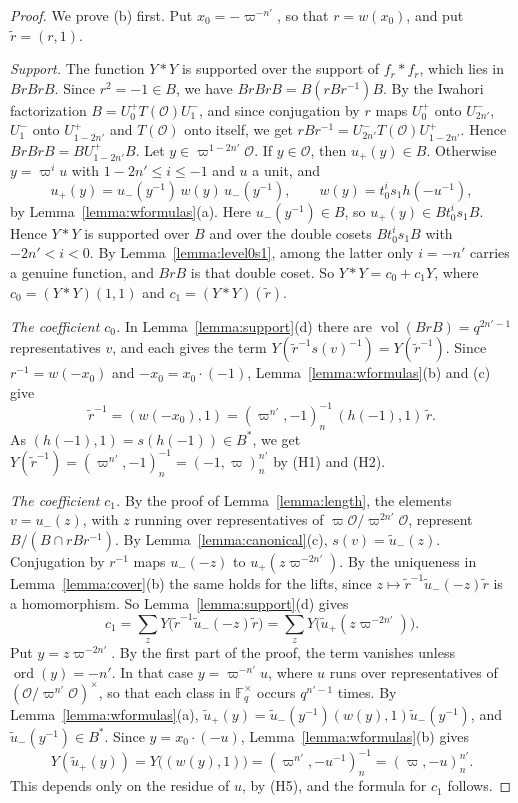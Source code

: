 \documentclass[12pt,letterpaper]{amsart}
\numberwithin{equation}{section}
\theoremstyle{definition}
\theoremstyle{remark}
\DeclareMathOperator{\vol}{vol}
\DeclareMathOperator{\ord}{ord}
\newcommand{\cO}{\mathcal{O}}
\newcommand{\Fq}{\mathbb{F}_q}
\begin{document}
\begin{proof}
We prove (b) first. Put $x_0=-\varpi^{-n'}$, so that $r=w(x_0)$, and
put $\tilde r=(r,1)$.

\emph{Support.} The function $Y*Y$ is supported over the support of
$f_r*f_r$, which lies in $BrBrB$. Since $r^2=-1\in B$, we have
$BrBrB=B(rBr^{-1})B$. By the Iwahori factorization
$B=U^+_0T(\cO)U^-_1$, and since conjugation by $r$ maps $U^+_0$ onto
$U^-_{2n'}$, $U^-_1$ onto $U^+_{1-2n'}$ and $T(\cO)$ onto itself, we
get $rBr^{-1}=U^-_{2n'}T(\cO)U^+_{1-2n'}$. Hence $BrBrB=BU^+_{1-2n'}B$.
Let $y\in\varpi^{1-2n'}\cO$. If $y\in\cO$, then $u_+(y)\in B$.
Otherwise $y=\varpi^iu$ with $1-2n'\leq i\leq -1$ and $u$ a unit, and
\begin{equation}
\label{eq:uplus}
u_+(y)=u_-(y^{-1})\,w(y)\,u_-(y^{-1}),\qquad w(y)=t_0^is_1h(-u^{-1}),
\end{equation}
by Lemma~\ref{lemma:wformulas}(a). Here $u_-(y^{-1})\in B$, so
$u_+(y)\in Bt_0^is_1B$. Hence $Y*Y$ is supported over $B$ and over the
double cosets $Bt_0^is_1B$ with $-2n'<i<0$. By
Lemma~\ref{lemma:level0s1}, among the latter only $i=-n'$ carries a
genuine function, and $BrB$ is that double coset. So $Y*Y=c_0+c_1Y$,
where $c_0=(Y*Y)(1,1)$ and $c_1=(Y*Y)(\tilde r)$.

\emph{The coefficient $c_0$.} In Lemma~\ref{lemma:support}(d) there
are $\vol(BrB)=q^{2n'-1}$ representatives $v$, and each gives the term
$Y(\tilde r^{-1}s(v)^{-1})=Y(\tilde r^{-1})$. Since $r^{-1}=w(-x_0)$
and $-x_0=x_0\cdot(-1)$, Lemma~\ref{lemma:wformulas}(b) and (c) give
\[
\tilde r^{-1}=(w(-x_0),1)=(\varpi^{n'},-1)_n^{-1}\,(h(-1),1)\,\tilde r .
\]
As $(h(-1),1)=s(h(-1))\in B^*$, we get
$Y(\tilde r^{-1})=(\varpi^{n'},-1)_n^{-1}=(-1,\varpi)_n^{n'}$ by (H1)
and (H2).

\emph{The coefficient $c_1$.} By the proof of
Lemma~\ref{lemma:length}, the elements $v=u_-(z)$, with $z$ running
over representatives of $\varpi\cO/\varpi^{2n'}\cO$, represent
$B/(B\cap rBr^{-1})$. By Lemma~\ref{lemma:canonical}(c),
$s(v)=\tilde u_-(z)$. Conjugation by $r^{-1}$ maps $u_-(-z)$ to
$u_+(z\varpi^{-2n'})$. By the uniqueness in
Lemma~\ref{lemma:cover}(b) the same holds for the lifts, since
$z\mapsto\tilde r^{-1}\tilde u_-(-z)\tilde r$ is a homomorphism. So
Lemma~\ref{lemma:support}(d) gives
\[
c_1=\sum_zY\bigl(\tilde r^{-1}\tilde u_-(-z)\tilde r\bigr)
=\sum_zY\bigl(\tilde u_+(z\varpi^{-2n'})\bigr).
\]
Put $y=z\varpi^{-2n'}$. By the first part of the proof, the term
vanishes unless $\ord(y)=-n'$. In that case $y=\varpi^{-n'}u$, where
$u$ runs over representatives of $(\cO/\varpi^{n'}\cO)^\times$, so
that each class in $\Fq^\times$ occurs $q^{n'-1}$ times. By
Lemma~\ref{lemma:wformulas}(a),
$\tilde u_+(y)=\tilde u_-(y^{-1})(w(y),1)\tilde u_-(y^{-1})$, and
$\tilde u_-(y^{-1})\in B^*$. Since $y=x_0\cdot(-u)$,
Lemma~\ref{lemma:wformulas}(b) gives
\[
Y(\tilde u_+(y))=Y\bigl((w(y),1)\bigr)=(\varpi^{n'},-u^{-1})_n^{-1}
=(\varpi,-u)_n^{n'} .
\]
This depends only on the residue of $u$, by (H5), and the formula for
$c_1$ follows.


\end{proof}
\end{document}
